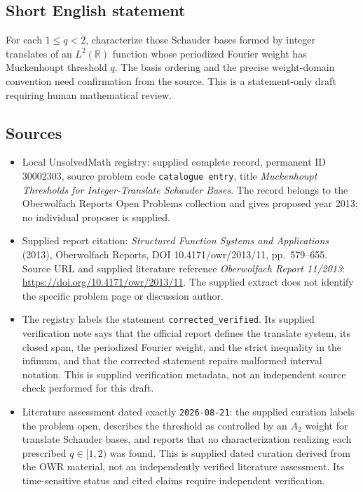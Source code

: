 \documentclass[11pt]{article}
\newcommand{\R}{\mathbb{R}}
\begin{document}
\subsection{Short English statement}
For each \(1\leq q<2\), characterize those Schauder bases formed by integer translates of an \(L^2(\R)\) function whose periodized Fourier weight has Muckenhoupt threshold \(q\). The basis ordering and the precise weight-domain convention need confirmation from the source. This is a statement-only draft requiring human mathematical review.
\subsection{Sources}
\begin{itemize}
\item Local UnsolvedMath registry: supplied complete record, permanent ID \(30002303\), source problem code \texttt{catalogue entry}, title \emph{Muckenhoupt Thresholds for Integer-Translate Schauder Bases}. The record belongs to the Oberwolfach Reports Open Problems collection and gives proposed year 2013; no individual proposer is supplied.
\item Supplied report citation: \emph{Structured Function Systems and Applications} (2013), Oberwolfach Reports, DOI 10.4171/owr/2013/11, pp.~579--655. Source URL and supplied literature reference \emph{Oberwolfach Report 11/2013}: \url{https://doi.org/10.4171/owr/2013/11}. The supplied extract does not identify the specific problem page or discussion author.
\item The registry labels the statement \texttt{corrected\_verified}. Its supplied verification note says that the official report defines the translate system, its closed span, the periodized Fourier weight, and the strict inequality in the infimum, and that the corrected statement repairs malformed interval notation. This is supplied verification metadata, not an independent source check performed for this draft.
\item Literature assessment dated exactly \texttt{2026-08-21}: the supplied curation labels the problem open, describes the threshold as controlled by an \(A_2\) weight for translate Schauder bases, and reports that no characterization realizing each prescribed \(q\in[1,2)\) was found. This is supplied dated curation derived from the OWR material, not an independently verified literature assessment. Its time-sensitive status and cited claims require independent verification.
\end{itemize}
\end{document}
